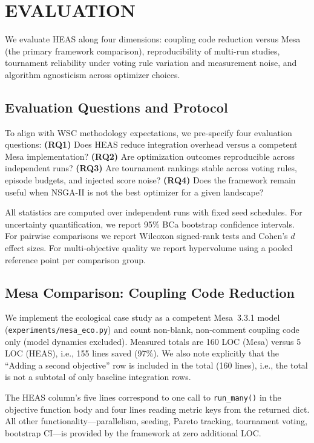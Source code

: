 \documentclass{wscpaperproc}
\begin{document}
\section{EVALUATION}

We evaluate HEAS along four dimensions: coupling code reduction versus Mesa
(the primary framework comparison), reproducibility of multi-run studies,
tournament reliability under voting rule variation and measurement noise, and
algorithm agnosticism across optimizer choices.

\subsection{Evaluation Questions and Protocol}

To align with WSC methodology expectations, we pre-specify four evaluation
questions:
\textbf{(RQ1)} Does HEAS reduce integration overhead versus a competent Mesa
implementation?
\textbf{(RQ2)} Are optimization outcomes reproducible across independent runs?
\textbf{(RQ3)} Are tournament rankings stable across voting rules, episode
budgets, and injected score noise?
\textbf{(RQ4)} Does the framework remain useful when NSGA-II is not the best
optimizer for a given landscape?

All statistics are computed over independent runs with fixed seed schedules.
For uncertainty quantification, we report 95\% BCa bootstrap confidence
intervals. For pairwise comparisons we report Wilcoxon signed-rank tests and
Cohen's $d$ effect sizes. For multi-objective quality we report hypervolume
using a pooled reference point per comparison group.

\subsection{Mesa Comparison: Coupling Code Reduction}
\label{sec:mesa-comparison}

We implement the ecological case study as a competent Mesa~3.3.1 model
(\texttt{experiments/mesa\_eco.py}) and count non-blank, non-comment coupling
code only (model dynamics excluded). Measured totals are 160 LOC (Mesa) versus
5 LOC (HEAS), i.e., 155 lines saved (97\%). We also note explicitly that the
``Adding a second objective'' row is included in the total (160 lines), i.e.,
the total is not a subtotal of only baseline integration rows.

The HEAS column's five lines correspond to one call to \texttt{run\_many()} in
the objective function body and four lines reading metric keys from the returned
dict. All other functionality---parallelism, seeding, Pareto tracking, tournament
voting, bootstrap CI---is provided by the framework at zero additional LOC.
\end{document}
